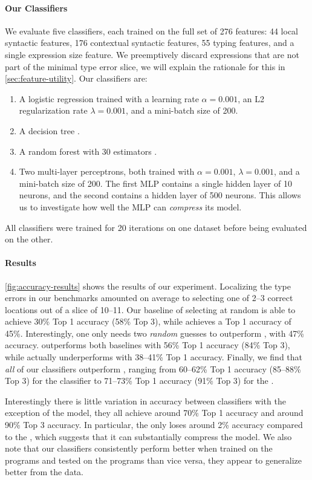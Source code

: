 \paragraph{Our Classifiers}
We evaluate five classifiers, each trained on the full set of 276
features: 44 local syntactic features, 176 contextual syntactic
features, 55 typing features, and a single expression size feature.
%
%
We preemptively discard expressions that are not part of the minimal
type error slice, we will explain the rationale for this in
\autoref{sec:feature-utility}.
%
Our classifiers are:
%
\begin{enumerate}
\item A logistic regression trained with a learning rate
  $\alpha = 0.001$, an L2 regularization rate $\lambda = 0.001$, and a
  mini-batch size of 200.
\item A decision tree .
\item A random forest with 30 estimators .
\item Two multi-layer perceptrons, both trained with $\alpha = 0.001$,
  $\lambda = 0.001$, and a mini-batch size of 200. The first MLP
  contains a single hidden layer of 10 neurons, and the second contains
  a hidden layer of 500 neurons. This allows us to investigate how well
  the MLP can \emph{compress} its model.
\end{enumerate}
%
All classifiers were trained for 20 iterations on one dataset before
being evaluated on the other.



\paragraph{Results}
\autoref{fig:accuracy-results} shows the results of our experiment.
%
Localizing the type errors in our benchmarks amounted on average to
selecting one of 2--3 correct locations out of a slice of 10--11.
%
Our baseline of selecting at random is able to achieve 30\% Top 1
accuracy (58\% Top 3), while \ocaml achieves a Top 1 accuracy of 45\%.
%
Interestingly, one only needs two \emph{random} guesses to outperform
\ocaml, with 47\% accuracy.
%
\sherrloc outperforms both baselines with 56\% Top 1 accuracy (84\% Top
3), while \mycroft actually underperforms \ocaml with 38--41\% Top 1
accuracy.
%
Finally, we find that \emph{all} of our classifiers outperform \sherrloc,
ranging from 60--62\% Top 1 accuracy (85--88\% Top 3) for the \linear
classifier to 71--73\% Top 1 accuracy (91\% Top 3) for the \hiddenFH.

Interestingly there is little variation in accuracy between classifiers
with the exception of the \linear model, they all achieve around 70\%
Top 1 accuracy and around 90\% Top 3 accuracy.
%
In particular, the \hiddenT only loses around 2\% accuracy compared to
the \hiddenFH, which suggests that it can substantially compress the
model.
%
We also note that our classifiers consistently perform better when
trained on the \FALL programs and tested on the \SPRING programs than
vice versa, they appear to generalize better from the \FALL data.
